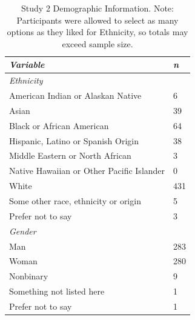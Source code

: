 \documentclass[12pt,]{article}
\begin{document}
\begin{table}[ht]
    \centering
    \begin{tabular}{l l}
        \toprule
        \emph{Variable} & \emph{n} \\
        \midrule
        \emph{Ethnicity} &  \\
        \hspace{1em} American Indian or Alaskan Native & 6 \\
        \hspace{1em} Asian & 39 \\
        \hspace{1em} Black or African American & 64 \\
        \hspace{1em} Hispanic, Latino or Spanish Origin & 38 \\
        \hspace{1em} Middle Eastern or North African & 3\\
        \hspace{1em} Native Hawaiian or Other Pacific Islander & 0 \\ 
        \hspace{1em} White & 431 \\ 
        \hspace{1em} Some other race, ethnicity or origin & 5 \\ 
        \hspace{1em} Prefer not to say & 3 \\ 
      \emph{Gender} & \\ 
         \hspace{1em} Man & 283 \\
         \hspace{1em} Woman & 280 \\
         \hspace{1em} Nonbinary & 9 \\
         \hspace{1em} Something not listed here & 1 \\
         \hspace{1em} Prefer not to say & 1 \\
        \bottomrule
    \end{tabular}
     \caption{Study 2 Demographic Information. Note: Participants were allowed to select as many options as they liked for Ethnicity, so totals may exceed sample size.}
     \label{demo2}
\end{table}


\end{document}
